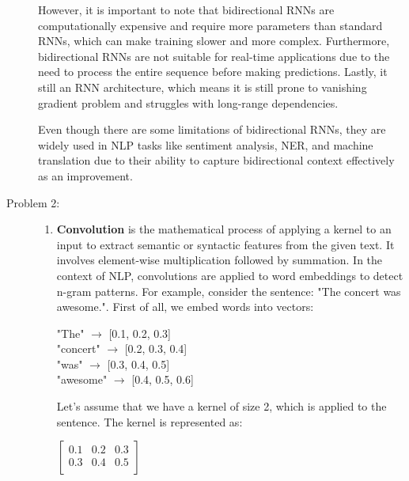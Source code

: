 \documentclass[10pt]{article}
\begin{document}
\begin{description}
However, it is important to note that bidirectional RNNs are computationally expensive and require more parameters than standard RNNs, which can make 
training slower and more complex.
Furthermore, bidirectional RNNs are not suitable for real-time applications due to the need to process the entire sequence before making predictions.
Lastly, it still an RNN architecture, which means it is still prone to vanishing gradient problem and struggles with long-range dependencies.

Even though there are some limitations of bidirectional RNNs, they are widely used in NLP tasks like sentiment analysis, NER, and machine translation 
due to their ability to capture bidirectional context effectively as an improvement.

\pagebreak

\item[Problem 2:] \hfill %
 
    \begin{enumerate}
        \item \textbf{Convolution} is the mathematical process of applying a kernel to an input to extract semantic or syntactic features from the given text.
        It involves element-wise multiplication followed by summation. In the context of NLP, convolutions are applied to word embeddings to detect n-gram patterns.
        For example, consider the sentence: "The concert was awesome.". First of all, we embed words into vectors:

        \begin{center}
            "The" $\rightarrow$ [0.1, 0.2, 0.3] \\
            "concert" $\rightarrow$ [0.2, 0.3, 0.4] \\
            "was" $\rightarrow$ [0.3, 0.4, 0.5] \\
            "awesome" $\rightarrow$ [0.4, 0.5, 0.6]
        \end{center}

        Let's assume that we have a kernel of size 2, which is applied to the sentence. The kernel is represented as:

        \begin{center}
            $\displaystyle{\begin{bmatrix} 0.1 & 0.2 & 0.3 \\  0.3 & 0.4 & 0.5 \\ \end{bmatrix}}$
        \end{center}


\end{enumerate}
\end{description}
\end{document}
